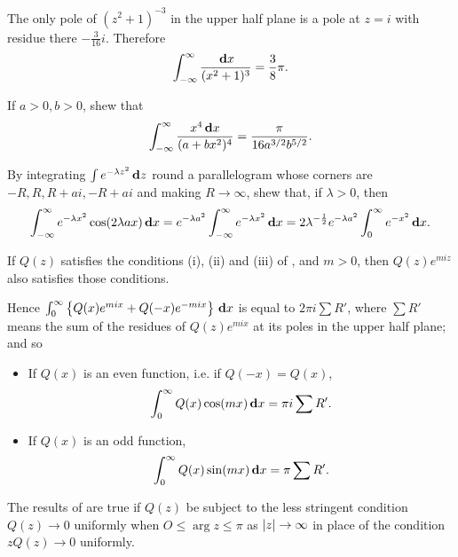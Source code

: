 \begin{wandwexample}
  The only pole of $(z^{2} + 1)^{-3}$ in the upper half plane is a
  pole at $z=i$ with residue there $-\frac{3}{16} i$. Therefore
  $$
  \int_{-\infty}^{\infty} \frac{\, \mathbf{d} x}{ (x^{2}+1)^{3} }
  =
  \frac{3}{8} \pi.
  $$
\end{wandwexample}
\begin{wandwexample}
If $a > 0, b > 0$, shew that
$$
\int_{-\infty}^{\infty}
\frac{x^{4} \, \mathbf{d} x}{ (a + bx^{2})^{4} }
=
\frac{\pi}{ 16 a^{3/2} b^{5/2}}.
$$
\end{wandwexample}
\begin{wandwexample}
  By integrating $\int e^{-\lambda z^{2}} \, \mathbf{d} z$ round a
parallelogram whose corners are $-R, R, R + ai, -R + ai$ and making $R
\rightarrow \infty$, shew that, if $\lambda > 0$, then
  $$
  \int_{-\infty}^{\infty} e^{-\lambda x^{2}} \cos (2\lambda a x)
\, \mathbf{d} x = e^{-\lambda a^{2}} \int_{-\infty}^{\infty} e^{-\lambda
x^{2}} \, \mathbf{d} x = 2 \lambda^{-\frac{1}{2}} e^{-\lambda a^{2}}
\int_{0}^{\infty} e^{-x^{2}} \, \mathbf{d} x.
  $$
\end{wandwexample}
If $Q(z)$ satisfies the conditions (i), (ii) and (iii) of
, and $m > 0$,
then $Q(z) e^{miz}$ also satisfies those conditions.

%
%

Hence
$
\int_{0}^{\infty}
\left\{ 
  Q(x) e^{mix} + Q(-x) e^{-mix}
 \right\}
\, \mathbf{d} x
$
is equal to $2\pi i \sum R'$, where
$\sum R'$ means the sum of the residues of $Q(z) e^{mix}$ at its poles
in the upper half plane; and so
\begin{itemize}
\item %
  If $Q(x)$ is an even function, i.e. if $Q (- x) = Q (x)$,
  $$
  \int_{0}^{\infty} Q(x) \cos(mx) \, \mathbf{d} x
  =
  \pi i \sum R'.
  $$
\item %
  If $Q(x)$ is an odd function,
  $$
  \int_{0}^{\infty} Q(x) \sin(mx) \, \mathbf{d} x
  =
  \pi \sum R'.
  $$
\end{itemize}

The results of  are true if $Q(z)$ be
subject to the less stringent condition $Q(z) \rightarrow 0$ uniformly
when
$O \leq \arg z \leq \pi$ as $\left| z \right| \rightarrow \infty$ in
place of the condition $z Q(z) \rightarrow 0$ uniformly.

